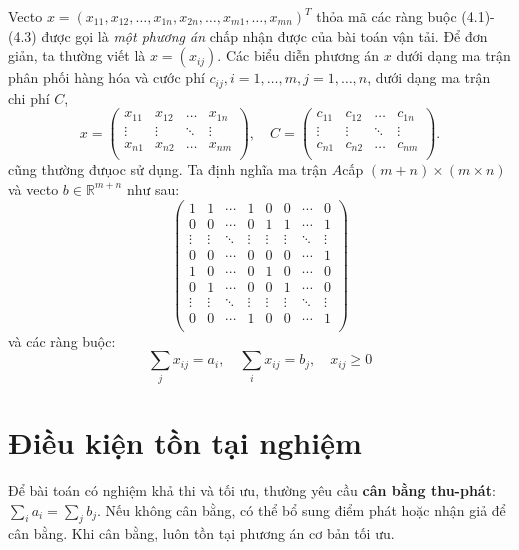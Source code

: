             Vecto $x = (x_{11}, x_{12}, \dots, x_{1n}, x_{2n}, \dots, x_{m1}, \dots, x_{mn})^T$ thỏa mã các ràng buộc (4.1)-(4.3) được gọi là \textit{một phương án} chấp nhận được của bài toán vận tải. Để đơn giản, ta thường viết là $x = (x_{ij})$. Các biểu diễn phương án $x$ dưới dạng ma trận phân phối hàng hóa và cước phí $c_{ij}, i=1, \dots, m, j= 1, \dots, n$, dưới dạng ma trận chi phí $C$,
            $$
            x= 
            \begin{pmatrix}
                x_{11} &x_{12}  &\dots  &x_{1n}  \\
                \vdots &\vdots  & \ddots  &\vdots  \\
                x_{n1} &x_{n2}  &\dots  & x_{nm} \\
            \end{pmatrix}
            , \quad C = 
            \begin{pmatrix}
                c_{11} &c_{12}  &\dots  &c_{1n}  \\
                \vdots &\vdots  & \ddots  &\vdots  \\
                c_{n1} &c_{n2}  &\dots  & c_{nm} \\
            \end{pmatrix}.
            $$
            cũng thường đưụoc sử dụng. Ta định nghĩa ma trận $A$cấp $(m+n) \times (m \times n)$ và vecto $b \in \mathbb{R}^{m+n}$ như sau:
            $$
            \begin{pmatrix}
            1 & 1 & \cdots & 1 & 0 & 0 & \cdots & 0 \\
            0 & 0 & \cdots & 0 & 1 & 1 & \cdots & 1 \\
            \vdots & \vdots & \ddots & \vdots & \vdots & \vdots & \ddots & \vdots \\
            0 & 0 & \cdots & 0 & 0 & 0 & \cdots & 1 \\
            1 & 0 & \cdots & 0 & 1 & 0 & \cdots & 0 \\
            0 & 1 & \cdots & 0 & 0 & 1 & \cdots & 0 \\
            \vdots & \vdots & \ddots & \vdots & \vdots & \vdots & \ddots & \vdots \\
            0 & 0 & \cdots & 1 & 0 & 0 & \cdots & 1 \\
            \end{pmatrix}
            $$
và các ràng buộc:
\[
\sum_j x_{ij} = a_i,\quad \sum_i x_{ij} = b_j,\quad x_{ij} \geq 0
\]

\section{Điều kiện tồn tại nghiệm}
Để bài toán có nghiệm khả thi và tối ưu, thường yêu cầu \textbf{cân bằng thu-phát}: $\sum_i a_i = \sum_j b_j$. Nếu không cân bằng, có thể bổ sung điểm phát hoặc nhận giả để cân bằng. Khi cân bằng, luôn tồn tại phương án cơ bản tối ưu.

